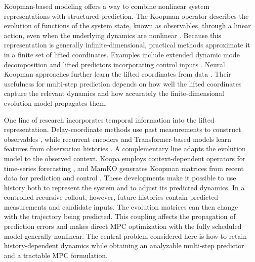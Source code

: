 \documentclass[journal]{IEEEtran}
\begin{document}
Koopman-based modeling offers a way to combine nonlinear system representations with structured prediction. The Koopman operator describes the evolution of functions of the system state, known as observables, through a linear action, even when the underlying dynamics are nonlinear \cite{koopman1931hamiltonian,mezic2005spectral,brunton2022modern}. Because this representation is generally infinite-dimensional, practical methods approximate it in a finite set of lifted coordinates. Examples include extended dynamic mode decomposition and lifted predictors incorporating control inputs \cite{williams2015data,proctor2016dmdc,korda2018linear}. Neural Koopman approaches further learn the lifted coordinates from data \cite{takeishi2017koopman,lusch2018deep,otto2019linearly,han2020deep}. Their usefulness for multi-step prediction depends on how well the lifted coordinates capture the relevant dynamics and how accurately the finite-dimensional evolution model propagates them.

One line of research incorporates temporal information into the lifted representation. Delay-coordinate methods use past measurements to construct observables \cite{kamb2020timedelay,das2019delay}, while recurrent encoders and Transformer-based models learn features from observation histories \cite{han2024robust,shenoy2025temporal,forootani2025deepkoopformer}. A complementary line adapts the evolution model to the observed context. Koopa employs context-dependent operators for time-series forecasting \cite{liu2023koopa}, and MamKO generates Koopman matrices from recent data for prediction and control \cite{li2025mamko}. These developments make it possible to use history both to represent the system and to adjust its predicted dynamics. In a controlled recursive rollout, however, future histories contain predicted measurements and candidate inputs. The evolution matrices can then change with the trajectory being predicted. This coupling affects the propagation of prediction errors and makes direct MPC optimization with the fully scheduled model generally nonlinear. The central problem considered here is how to retain history-dependent dynamics while obtaining an analyzable multi-step predictor and a tractable MPC formulation.
\end{document}
